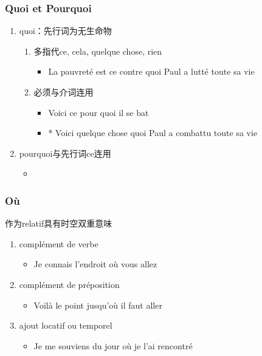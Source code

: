 \documentclass[UTF8]{report}
\begin{document}
\subsubsection{Quoi et Pourquoi}
\begin{enumerate}
    \item quoi：先行词为无生命物
    \begin{enumerate}
        \item 多指代ce, cela, quelque chose, rien
        \begin{itemize}
            \item La pauvreté est ce contre quoi Paul a lutté toute sa vie
        \end{itemize}
        \item 必须与介词连用
        \begin{itemize}
            \item Voici ce pour quoi il se bat
            \item * Voici quelque chose quoi Paul a combattu toute sa vie
        \end{itemize}
    \end{enumerate}
    \item pourquoi与先行词ce连用
    \begin{itemize}
        \item 
    \end{itemize}
\end{enumerate}

\subsubsection{Où}
作为relatif具有时空双重意味
\begin{enumerate}
    \item complément de verbe
    \begin{itemize}
        \item Je connais l’endroit où vous allez
    \end{itemize}
    \item complément de préposition
    \begin{itemize}
        \item Voilà le point jusqu’où il faut aller
    \end{itemize}
    \item ajout locatif ou temporel
    \begin{itemize}
        \item Je me souviens du jour où je l’ai rencontré
    \end{itemize}
\end{enumerate}
\end{document}
